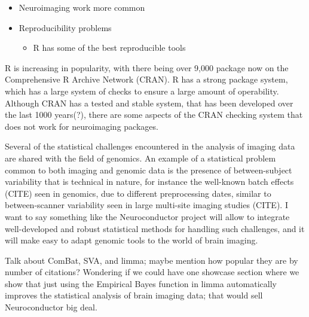 \documentclass[]{elsarticle} %
\providecommand{\tightlist}{%
  \setlength{\itemsep}{0pt}\setlength{\parskip}{0pt}}
\newcommand{\fixme}[1]{{\color{red} #1}}
\newcommand{\fixme}[1]{{\color{red} #1}}
\begin{document}
\begin{itemize}
\tightlist
\item
  Neuroimaging work more common
\item
  Reproducibility problems

  \begin{itemize}
  \tightlist
  \item
    R has some of the best reproducible tools
  \end{itemize}
\end{itemize}

R is increasing in popularity, with there being over 9,000 package now
on the Comprehensive R Archive Network (CRAN). R has a strong package
system, which has a large system of checks to ensure a large amount of
operability. Although CRAN has a tested and stable system, that has been
developed over the last 1000 years(?), there are some aspects of the
CRAN checking system that does not work for neuroimaging packages.

\fixme{Several of the statistical challenges encountered in the analysis of imaging data are shared with the field of genomics. An example of a statistical problem common to both imaging and genomic data is the presence of between-subject variability that is technical in nature, for instance the well-known batch effects (CITE) seen in genomics, due to different preprocessing dates, similar to between-scanner variability seen in large multi-site imaging studies (CITE). I want to say something like the Neuroconductor project will allow to integrate well-developed and robust statistical methods for handling such challenges, and it will make easy to adapt genomic tools to the world of brain imaging.

Talk about ComBat, SVA, and limma; maybe mention how popular they are by number of citations? Wondering if we could have one showcase section where we show that just using the Empirical Bayes function in limma automatically improves the statistical analysis of brain imaging data; that would sell Neuroconductor big deal. }
\end{document}
